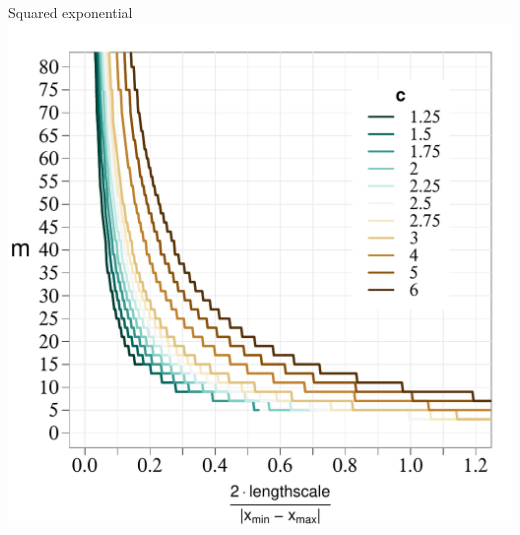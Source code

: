 \documentclass[8pt]{beamer} %
\begin{document}
\begin{frame}

\vspace{3mm}

\begin{columns}
\hspace{7mm} \centering \scriptsize Squared exponential\\
\includegraphics[scale=0.29, trim = 0mm 0mm 5mm 10mm, clip]{ch5_fig6_lscale_vs_J_vs_c_zoomin.pdf}


\end{columns}
\end{frame}
\end{document}

